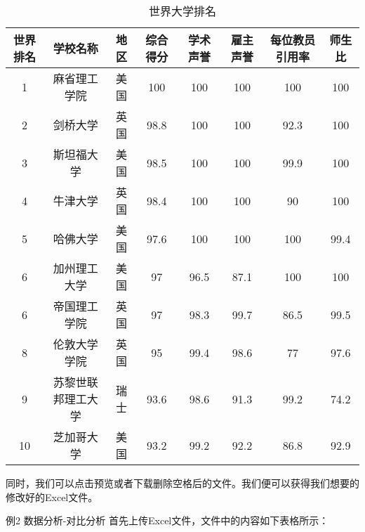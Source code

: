 \begin{table}[h]
    \centering
    \begin{tabular}{cccccccc}
        \toprule
        世界排名 & 学校名称 & 地区 & 综合得分 & 学术声誉 & 雇主声誉 & 每位教员引用率 & 师生比 \\
        \midrule
        1  & 麻省理工学院     & 美国 & 100  & 100  & 100  & 100  & 100  \\
        2  & 剑桥大学         & 英国 & 98.8 & 100  & 100  & 92.3 & 100  \\
        3  & 斯坦福大学       & 美国 & 98.5 & 100  & 100  & 99.9 & 100  \\
        4  & 牛津大学         & 英国 & 98.4 & 100  & 100  & 90   & 100  \\
        5  & 哈佛大学         & 美国 & 97.6 & 100  & 100  & 100  & 99.4 \\
        6  & 加州理工大学     & 美国 & 97   & 96.5 & 87.1 & 100  & 100  \\
        6  & 帝国理工学院     & 英国 & 97   & 98.3 & 99.7 & 86.5 & 99.5 \\
        8  & 伦敦大学学院     & 英国 & 95   & 99.4 & 98.6 & 77   & 97.6 \\
        9  & 苏黎世联邦理工大学 & 瑞士 & 93.6 & 98.6 & 91.3 & 99.2 & 74.2 \\
        10 & 芝加哥大学       & 美国 & 93.2 & 99.2 & 92.2 & 86.8 & 92.9 \\
        \bottomrule
    \end{tabular}
    \caption{世界大学排名}
    \label{tab:world_ranking}
\end{table}
\FloatBarrier
同时，我们可以点击预览或者下载删除空格后的文件。我们便可以获得我们想要的修改好的Excel文件。


例2 数据分析-对比分析
首先上传Excel文件，文件中的内容如下表格所示：

